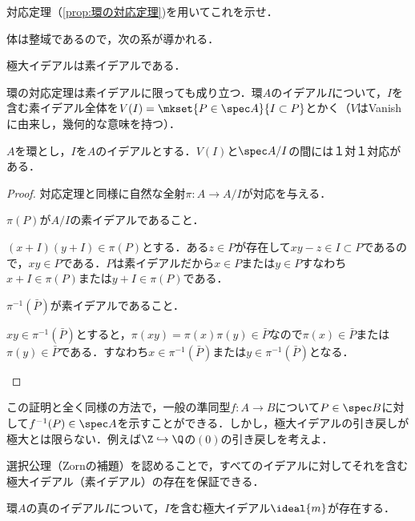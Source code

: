 \begin{exer}
	対応定理（\ref{prop:環の対応定理})を用いてこれを示せ．
\end{exer}

体は整域であるので，次の系が導かれる．

\begin{cor}
	極大イデアルは素イデアルである．
\end{cor}

環の対応定理は素イデアルに限っても成り立つ．環$A$のイデアル$I$について，$I$を含む素イデアル全体を$V(I)=\mkset{P\in\spec A}{I\subset P}$とかく（$V$はVanishに由来し，幾何的な意味を持つ）．

\begin{prop}[素イデアルの対応定理]
	$A$を環とし，$I$を$A$のイデアルとする．$V(I)$と$\spec A/I$の間には１対１対応がある．
\end{prop}
\begin{proof}
	対応定理と同様に自然な全射$\pi:A\to A/I$が対応を与える．
	\begin{step}
		\item $\pi(P)$が$A/I$の素イデアルであること．
		
		 $(x+I)(y+I)\in\pi(P)$とする．ある$z\in P$が存在して$xy-z\in I\subset P$であるので，$xy\in P$である．$P$は素イデアルだから$x\in P$または$y\in P$すなわち$x+I\in\pi(P)$または$y+I\in\pi(P)$である．
		
		\item $\pi^{-1}(\bar{P})$が素イデアルであること．
		
		$xy\in\pi^{-1}(\bar{P})$とすると，$\pi(xy)=\pi(x)\pi(y)\in\bar{P}$なので$\pi(x)\in \bar{P}$または$\pi(y)\in \bar{P}$である．すなわち$x\in\pi^{-1}(\bar{P})$または$y\in\pi^{-1}(\bar{P})$となる．
	\end{step}
\end{proof}

この証明と全く同様の方法で，一般の準同型$f:A\to B$について$P\in\spec B$に対して$f^{-1}(P)\in\spec A$を示すことができる．しかし，極大イデアルの引き戻しが極大とは限らない．例えば$\Z\hookrightarrow\Q$の$(0)$の引き戻しを考えよ．

選択公理（Zornの補題）を認めることで，すべてのイデアルに対してそれを含む極大イデアル（素イデアル）の存在を保証できる．

\begin{thm}[Krullの極大イデアル存在定理]
	環$A$の真のイデアル$I$について，$I$を含む極大イデアル$\ideal{m}$が存在する．
\end{thm}

